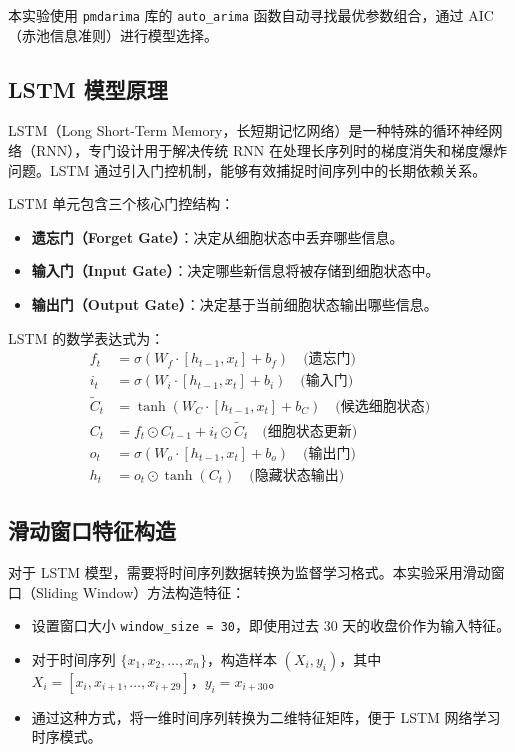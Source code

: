 \documentclass[a4paper]{article}
\begin{document}
本实验使用 \texttt{pmdarima} 库的 \texttt{auto\_arima} 函数自动寻找最优参数组合，通过 AIC（赤池信息准则）进行模型选择。

\subsection{LSTM 模型原理}

LSTM（Long Short-Term Memory，长短期记忆网络）是一种特殊的循环神经网络（RNN），专门设计用于解决传统 RNN 在处理长序列时的梯度消失和梯度爆炸问题。LSTM 通过引入门控机制，能够有效捕捉时间序列中的长期依赖关系。

LSTM 单元包含三个核心门控结构：
\begin{itemize}
    \item \textbf{遗忘门（Forget Gate）}：决定从细胞状态中丢弃哪些信息。
    \item \textbf{输入门（Input Gate）}：决定哪些新信息将被存储到细胞状态中。
    \item \textbf{输出门（Output Gate）}：决定基于当前细胞状态输出哪些信息。
\end{itemize}

LSTM 的数学表达式为：
\begin{align}
f_t &= \sigma(W_f \cdot [h_{t-1}, x_t] + b_f) \quad \text{(遗忘门)} \\
i_t &= \sigma(W_i \cdot [h_{t-1}, x_t] + b_i) \quad \text{(输入门)} \\
\tilde{C}_t &= \tanh(W_C \cdot [h_{t-1}, x_t] + b_C) \quad \text{(候选细胞状态)} \\
C_t &= f_t \odot C_{t-1} + i_t \odot \tilde{C}_t \quad \text{(细胞状态更新)} \\
o_t &= \sigma(W_o \cdot [h_{t-1}, x_t] + b_o) \quad \text{(输出门)} \\
h_t &= o_t \odot \tanh(C_t) \quad \text{(隐藏状态输出)}
\end{align}

\subsection{滑动窗口特征构造}

对于 LSTM 模型，需要将时间序列数据转换为监督学习格式。本实验采用滑动窗口（Sliding Window）方法构造特征：

\begin{itemize}
    \item 设置窗口大小 \texttt{window\_size = 30}，即使用过去 30 天的收盘价作为输入特征。
    \item 对于时间序列 $\{x_1, x_2, \ldots, x_n\}$，构造样本 $(X_i, y_i)$，其中 $X_i = [x_i, x_{i+1}, \ldots, x_{i+29}]$，$y_i = x_{i+30}$。
    \item 通过这种方式，将一维时间序列转换为二维特征矩阵，便于 LSTM 网络学习时序模式。
\end{itemize}
\end{document}
